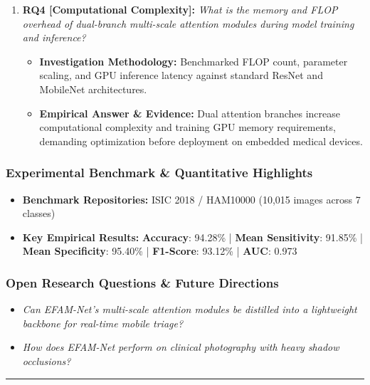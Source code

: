 \begin{enumerate}[label=\textbf{\arabic*.}, leftmargin=*]
\begin{itemize}[leftmargin=1.5em]
    \item \textbf{Empirical Answer \& Evidence:} Achieved mean sensitivity of 91.85\%, mean specificity of 95.40\%, F1-score of 93.12\%, and an impressive ROC-AUC of 0.973.
  \end{itemize}
  \item \textbf{RQ4 [Computational Complexity]:} \textit{What is the memory and FLOP overhead of dual-branch multi-scale attention modules during model training and inference?}
  \begin{itemize}[leftmargin=1.5em]
    \item \textbf{Investigation Methodology:} Benchmarked FLOP count, parameter scaling, and GPU inference latency against standard ResNet and MobileNet architectures.
    \item \textbf{Empirical Answer \& Evidence:} Dual attention branches increase computational complexity and training GPU memory requirements, demanding optimization before deployment on embedded medical devices.
  \end{itemize}
\end{enumerate}

\subsubsection*{Experimental Benchmark \& Quantitative Highlights}
\begin{itemize}[leftmargin=*]
  \item \textbf{Benchmark Repositories:} ISIC 2018 / HAM10000 (10,015 images across 7 classes)
  \item \textbf{Key Empirical Results:} \textbf{Accuracy}: 94.28\% \quad | \quad \textbf{Mean Sensitivity}: 91.85\% \quad | \quad \textbf{Mean Specificity}: 95.40\% \quad | \quad \textbf{F1-Score}: 93.12\% \quad | \quad \textbf{AUC}: 0.973
\end{itemize}

\subsubsection*{Open Research Questions \& Future Directions}
\begin{itemize}[leftmargin=*]
  \item \textit{Can EFAM-Net's multi-scale attention modules be distilled into a lightweight backbone for real-time mobile triage?}
  \item \textit{How does EFAM-Net perform on clinical photography with heavy shadow occlusions?}
\end{itemize}
\vspace{0.8em}\hrule\vspace{1.2em}
